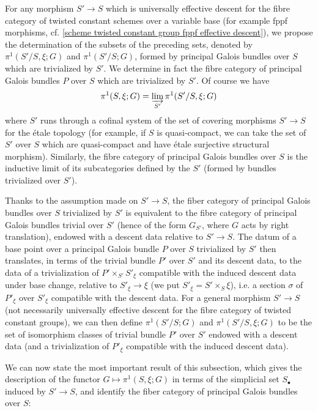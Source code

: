 For any morphism $S'\to S$ which is universally effective descent for the fibre category of twisted constant schemes over a variable base (for example fppf morphisms, cf. \cref{scheme twisted constant group fppf effective descent}), we propose the determination of the subsets of the preceding sets, denoted by $\pi^1(S'/S,\xi;G)$ and $\pi^1(S'/S;G)$, formed by principal Galois bundles over $S$ which are trivialized by $S'$. We determine in fact the fibre category of principal Galois bundles $P$ over $S$ which are trivialized by $S'$. Of course we have
\[\pi^1(S,\xi;G)=\varinjlim_{S'}\pi^1(S'/S,\xi;G)\]
where $S'$ runs through a cofinal system of the set of covering morphisms $S'\to S$ for the \'etale topology (for example, if $S$ is quasi-compact, we can take the set of $S'$ over $S$ which are quasi-compact and have \'etale surjective structural morphism). Similarly, the fibre category of principal Galois bundles over $S$ is the inductive limit of its subcategories defined by the $S'$ (formed by bundles trivialized over $S'$).\par
Thanks to the assumption made on $S'\to S$, the fiber category of principal Galois bundles over $S$ trivialized by $S'$ is equivalent to the fibre category of principal Galois bundles trivial over $S'$ (hence of the form $G_{S'}$, where $G$ acts by right translation), endowed with a descent data relative to $S'\to S$. The datum of a base point over a principal Galois bundle $P$ over $S$ trivialized by $S'$ then translates, in terms of the trivial bundle $P'$ over $S'$ and its descent data, to the data of a trivialization of $P'\times_{S'}S'_\xi$ compatible with the induced descent data under base change, relative to $S'_\xi\to\xi$ (we put $S'_\xi=S'\times_S\xi$), i.e. a section $\sigma$ of $P'_\xi$ over $S'_\xi$ compatible with the descent data. For a general morphism $S'\to S$ (not necessarily universally effective descent for the fibre category of twisted constant groups), we can then define $\pi^1(S'/S;G)$ and $\pi^1(S'/S,\xi;G)$ to be the set of isomorphism classes of trivial bundle $P'$ over $S'$ endowed with a descent data (and a trivialization of $P'_\xi$ compatible with the induced descent data).\par
We can now state the most important result of this subsection, which gives the description of the functor $G\mapsto\pi^1(S,\xi;G)$ in terms of the simplicial set $S_\bullet$ induced by $S'\to S$, and identify the fiber category of principal Galois bundles over $S$:

